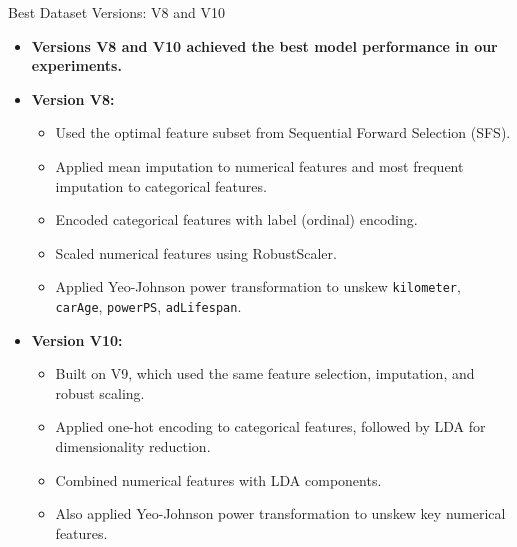 \documentclass{beamer}
\begin{document}
\begin{frame}{Best Dataset Versions: V8 and V10}
        \begin{itemize}
                \item \textbf{Versions V8 and V10 achieved the best model
                        performance in our experiments.}
                \item \textbf{Version V8:}
                        \begin{itemize}
                                \item Used the optimal feature subset from
                                        Sequential Forward Selection (SFS).
                                \item Applied mean imputation to numerical
                                        features and most frequent imputation
                                        to categorical features.
                                \item Encoded categorical features with label
                                        (ordinal) encoding.
                                \item Scaled numerical features using
                                        RobustScaler.
                                \item Applied Yeo-Johnson power transformation
                                        to unskew \texttt{kilometer},
                                        \texttt{carAge}, \texttt{powerPS},
                                        \texttt{adLifespan}.
                        \end{itemize}
                \item \textbf{Version V10:}
                        \begin{itemize}
                                \item Built on V9, which used the same feature
                                        selection, imputation, and robust
                                        scaling.
                                \item Applied one-hot encoding to categorical
                                        features, followed by LDA for
                                        dimensionality reduction.
                                \item Combined numerical features with LDA
                                        components.
                                \item Also applied Yeo-Johnson power
                                        transformation to unskew key numerical
                                        features.
                        \end{itemize}
        \end{itemize}
\end{frame}
\end{document}
